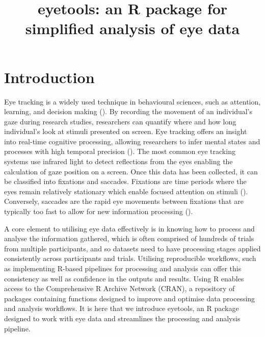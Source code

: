 \documentclass[
  man,
  floatsintext,
  longtable,
  nolmodern,
  notxfonts,
  notimes,
  colorlinks=true,linkcolor=blue,citecolor=blue,urlcolor=blue]{apa7}
\title{eyetools: an R package for simplified analysis of eye data}
\affiliation{
{Lancaster University}}
\begin{document}
\maketitle


\setcounter{secnumdepth}{-\maxdimen} %

\setlength\LTleft{0pt}

\resetlinenumber[1]

\section{Introduction}\label{introduction}

Eye tracking is a widely used technique in behavioural sciences, such as
attention, learning, and decision making
(). By
recording the movement of an individual's gaze during research studies,
researchers can quantify where and how long individual's look at stimuli
presented on screen. Eye tracking offers an insight into real-time
cognitive processing, allowing researchers to infer mental states and
processes with high temporal precision
(). The
most common eye tracking systems use infrared light to detect
reflections from the eyes enabling the calculation of gaze position on a
screen. Once this data has been collected, it can be classified into
fixations and saccades. Fixations are time periods where the eyes remain
relatively stationary which enable focused attention on stimuli
(). Conversely, saccades are
the rapid eye movements between fixations that are typically too fast to
allow for new information processing
().

A core element to utilising eye data effectively is in knowing how to
process and analyse the information gathered, which is often comprised
of hundreds of trials from multiple participants, and so datasets need
to have processing stages applied consistently across participants and
trials. Utilising reproducible workflows, such as implementing R-based
pipelines for processing and analysis can offer this consistency as well
as confidence in the outputs and results. Using R enables access to the
Comprehensive R Archive Network (CRAN), a repository of packages
containing functions designed to improve and optimise data processing
and analysis workflows. It is here that we introduce eyetools, an R
package designed to work with eye data and streamlines the processing
and analysis pipeline.
\end{document}
